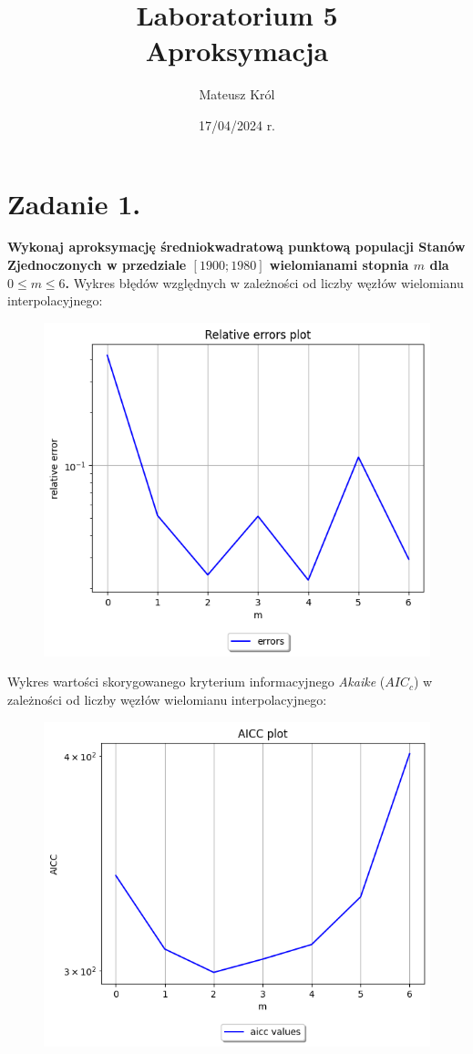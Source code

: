 \documentclass{article}
\title{%
Laboratorium 5\\
  \huge Aproksymacja}
\author{Mateusz Król}
\date{17/04/2024 r.}
\begin{document}
\maketitle

 
\section*{Zadanie 1.}
\textbf{Wykonaj aproksymację średniokwadratową punktową populacji
Stanów Zjednoczonych w przedziale $[1900;1980]$ wielomianami stopnia $m$ dla
$0 \leq m \leq 6$.}
\newpage
Wykres błędów względnych w zależności od liczby węzłów wielomianu 
interpolacyjnego:
\begin{figure}[H]
  \includegraphics[width=\linewidth]{figures/errors.png}
\end{figure}
\newpage
Wykres wartości skorygowanego kryterium informacyjnego \textit{Akaike} 
($AIC_c$) w zależności od liczby węzłów wielomianu 
interpolacyjnego:
\begin{figure}[H]
  \includegraphics[width=\linewidth]{figures/aicc.png}
\end{figure}
\end{document}
